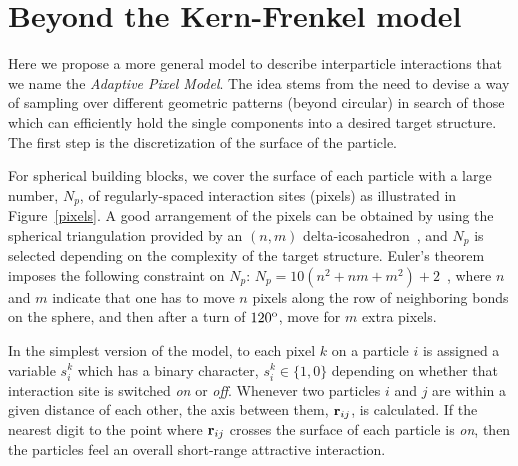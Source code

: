 {\section{Beyond the Kern-Frenkel model}
Here we propose a more general model to describe interparticle interactions that we name the {\it Adaptive Pixel Model}.
The idea stems from the need to devise a  way of sampling over different geometric patterns (beyond circular) in search of those which can efficiently hold the single components into a desired target structure.
The first step is the discretization of the surface of the particle.

For spherical building blocks, we cover the surface of each particle with a large number, $N_p$, of regularly-spaced interaction sites (pixels) as illustrated in Figure~\ref{pixels}.
A good arrangement of the pixels can be obtained by using the spherical triangulation provided by an $(n,m)$ delta-icosahedron~\cite{geom}, and $N_p$ is selected depending on the complexity of the target structure.
Euler's theorem imposes the following constraint on  $N_p$: $N_p=10(n^2+nm+m^2)+2$~\cite{geom}, where $n$ and $m$  indicate that one has to move $n$ pixels  along the row of neighboring bonds on the sphere, and then after a turn of $120^{\rm o}$, move for $m$ extra pixels. 
 
In the simplest version of the model, to each pixel $k$ on a particle $i$ is assigned a variable $s_i^k$ which has a binary character, $s_i^k\in\{1,0\}$ depending on whether that  interaction site is switched {\it on} or {\it off}.
Whenever two particles $i$ and $j$ are within a given distance of each other, the axis between them, ${\bf{r}}_{ij}$, is calculated.
If the nearest digit to the point where ${\bf{r}}_{ij}$ crosses the surface of each particle is {\it on}, then the particles feel an overall short-range attractive interaction.

}
